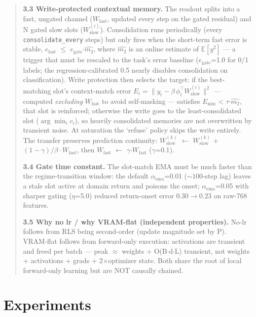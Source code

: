 \documentclass[11pt]{article}
\begin{document}
\begin{quote}
\textbf{3.3 Write-protected contextual memory.} The readout splits into a fast, ungated channel (\(W_{\mathrm{fast}}\), updated every step on the gated residual) and N gated slow slots (\(W_{\mathrm{slow}}^{(i)}\)). Consolidation runs periodically (every \texttt{consolidate\_every} steps) but only fires when the short-term fast error is stable, \(e_{\mathrm{fast}}\) \(\leq\) \(e_{\mathrm{gate}}\)\(\cdot\)\(\widehat{m_2}\), where \(\widehat{m_2}\) is an online estimate of \(\mathbb{E}[y^2]\) --- a trigger that must be rescaled to the task's error baseline (\(e_{\mathrm{gate}}\)=1.0 for 0/1 labels; the regression-calibrated 0.5 nearly disables consolidation on classification). Write protection then selects the target: if the best-matching slot's context-match error \(E_i = \|y_t - \beta\,\phi_t^\top W_{\mathrm{slow}}^{(i)}\|^2\) --- computed \emph{excluding} \(W_{\mathrm{fast}}\) to avoid self-masking --- satisfies \(E_{\min}\) \textless{} \(\tau\)\(\cdot\)\(\widehat{m_2}\), that slot is reinforced; otherwise the write goes to the least-consolidated slot (\(\arg\min_i c_i\)), so heavily consolidated memories are not overwritten by transient noise. At saturation the `refuse' policy skips the write entirely. The transfer preserves prediction continuity: \(W_{\mathrm{slow}}^{(k)}\) \(\leftarrow\) \(W_{\mathrm{slow}}^{(k)}\) + \((1-\gamma)/\beta \cdot W_{\mathrm{fast}}\), then \(W_{\mathrm{fast}}\) \(\leftarrow\) \(\gamma\)\(\cdot\)\(W_{\mathrm{fast}}\) (\(\gamma\)=0.1).

\textbf{3.4 Gate time constant.} The slot-match EMA must be much faster than the regime-transition window: the default \(\alpha_{\mathrm{ema}}\)=0.01 (\(\sim 100\)-step lag) leaves a stale slot active at domain return and poisons the onset; \(\alpha_{\mathrm{ema}}\)=0.05 with sharper gating (\(\eta\)=5.0) reduced return-onset error 0.30\(\to 0.23\) on raw-768 features.

\textbf{3.5 Why no lr / why VRAM-flat (independent properties).} No-lr follows from RLS being second-order (update magnitude set by P). VRAM-flat follows from forward-only execution: activations are transient and freed per batch --- peak \(\approx\) weights + O(B\(\cdot\)d\(\cdot\)L) transient, not weights + activations + grads + 2\(\times\)optimizer state. Both share the root of local forward-only learning but are NOT causally chained.
\end{quote}

\section{Experiments}\label{experiments}
\end{document}
